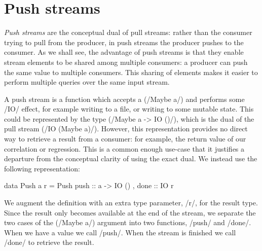 

\section{Push streams}
\label{taxonomy/push}

\emph{Push streams} are the conceptual dual of pull streams: rather than the consumer trying to pull from the producer, in push streams the producer pushes to the consumer.
As we shall see, the advantage of push streams is that they enable stream elements to be shared among multiple consumers: a producer can push the same value to multiple consumers.
This sharing of elements makes it easier to perform multiple queries over the same input stream.

A push stream is a function which accepts a (\Hs/Maybe a/) and performs some \Hs/IO/ effect, for example writing to a file, or writing to some mutable state.
This could be represented by the type (\Hs/Maybe a -> IO ()/), which is the dual of the pull stream (\Hs/IO (Maybe a)/).
However, this representation provides no direct way to retrieve a result from a consumer: for example, the return value of our correlation or regression.
This is a common enough use-case that it justifies a departure from the conceptual clarity of using the exact dual.
We instead use the following representation:

\begin{haskell}
data Push a r = Push
  { push :: a -> IO ()
  , done :: IO r }
\end{haskell}

We augment the definition with an extra type parameter, \Hs/r/, for the result type.
Since the result only becomes available at the end of the stream, we separate the two cases of the (\Hs/Maybe a/) argument into two functions, \Hs/push/ and \Hs/done/.
When we have a value we call \Hs/push/.
When the stream is finished we call \Hs/done/ to retrieve the result.




